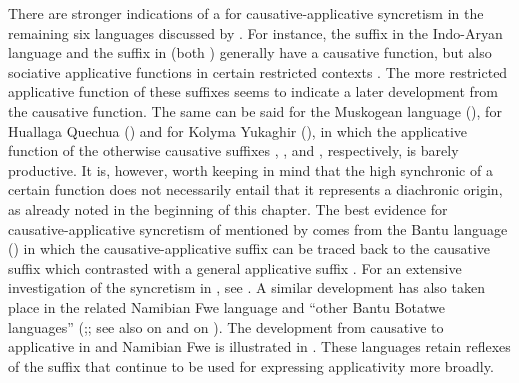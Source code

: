 There are stronger indications of a  for causative-applicative syncretism in the remaining six languages discussed by \citet{shibatani:pardeshi:2002}. For instance, the suffix  in the Indo-Aryan language  and the suffix  in  (both ) generally have a causative function, but also sociative applicative functions in certain restricted contexts \citep[96ff.]{shibatani:pardeshi:2002}. The more restricted applicative function of these suffixes seems to indicate a later development from the causative function. The same can be said for the Muskogean language  (), for Huallaga Quechua () and for Kolyma Yukaghir (), in which the applicative function of the otherwise causative suffixes  \citep[225]{martin:2011},  \citep[163]{weber:1989}, and  \citep[215]{maslova:2003}, respectively, is barely productive. It is, however, worth keeping in mind that the high synchronic  of a certain function does not necessarily entail that it represents a diachronic origin, as already noted in the beginning of this chapter. The best evidence for causative-applicative syncretism of  mentioned by \citet{shibatani:pardeshi:2002} comes from the Bantu language  () in which the causative-applicative suffix  can be traced back to the  causative suffix  which contrasted with a general applicative suffix  \citep{meeussen:1967, bastin:1986, schadeberg:2003}. For an extensive investigation of the syncretism in , see \citet{jerro:2017}. A similar development has also taken place in the related Namibian Fwe language and “other Bantu Botatwe languages” (\citealt[216ff.]{gunnink:2018};; see also \citealt[66]{peterson:2007} on  and \citealt[90]{creissels:2016} on ). The development from causative to applicative in  \citep[6f.]{jerro:2017} and Namibian Fwe \citep[216f.]{gunnink:2018} is illustrated in . These languages retain reflexes of the  suffix  that continue to be used for expressing applicativity more broadly.

